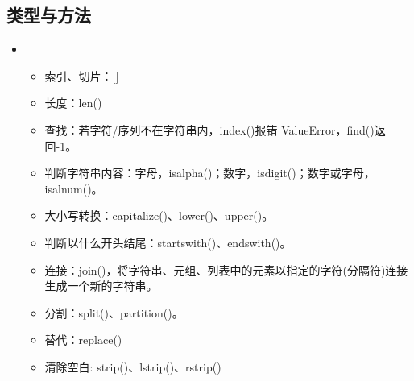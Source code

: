 \documentclass[letterpaper,10pt,english]{sphinxmanual}
\begin{document}
\subsection{类型与方法}
\label{\detokenize{python/08_basicType:id2}}\begin{itemize}
\item {} 
\begin{itemize}
\item {} 
索引、切片：{[}{]}

\item {} 
长度：len()

\item {} 
查找：若字符/序列不在字符串内，index()报错 ValueError，find()返回-1。

\item {} 
判断字符串内容：字母，isalpha()；数字，isdigit()；数字或字母，isalnum()。

\item {} 
大小写转换：capitalize()、lower()、upper()。

\item {} 
判断以什么开头结尾：startswith()、endswith()。

\item {} 
连接：join()，将字符串、元组、列表中的元素以指定的字符(分隔符)连接生成一个新的字符串。

\item {} 
分割：split()、partition()。 

\item {} 
替代：replace()

\item {} 
清除空白: strip()、lstrip()、rstrip()

\end{itemize}

%
\begin{sphinxVerbatim}[commandchars=\\\{\},numbers=left,firstnumber=1,stepnumber=1]
  
 
  \PYG{p}{[}  \PYG{p}{]}
 


\end{sphinxVerbatim}
\end{itemize}
\end{document}
